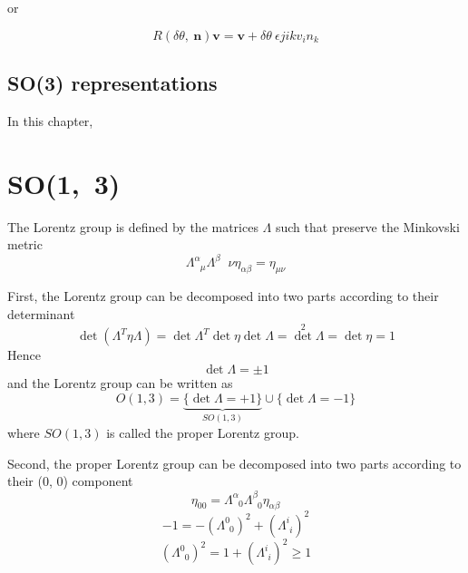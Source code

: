     or 

    \begin{equation*}
        R(\delta \theta, ~ \mathbf n) \mathbf v = \mathbf v + \delta \theta ~ \epsilon{jik} v_i n_k 
    \end{equation*}


\section{SO(3) representations}

    In this chapter, 

\chapter{SO(1,~3)}

    The Lorentz group is defined by the matrices $\Lambda$ such that preserve the Minkovski metric 
    \begin{equation}\label{lorentz}
        \Lambda^\alpha_{\phantom \alpha \mu} \Lambda^\beta{\phantom \beta \nu} \eta_{\alpha \beta} = \eta_{\mu \nu}
    \end{equation}

    First, the Lorentz group can be decomposed into two parts according to their determinant
    \begin{equation*}
        \det (\Lambda^T \eta \Lambda) = \det \Lambda^T \det \eta \det \Lambda = \det^2 \Lambda = \det \eta = 1
    \end{equation*}
    Hence 
    \begin{equation*}
        \det \Lambda = \pm 1
    \end{equation*}
    and the Lorentz group can be written as
    \begin{equation*}
        O(1,3) = \underbrace{\{\det \Lambda = +1\}}_{SO(1,3)} \cup \{\det \Lambda = - 1\} 
    \end{equation*}
    where $SO(1,3)$ is called the proper Lorentz group.

    Second, the proper Lorentz group can be decomposed into two parts according to their (0, 0) component
    \begin{equation*}
        \eta_{00} = \Lambda^\alpha_{\phantom \alpha 0} \Lambda^\beta_{\phantom \beta 0} \eta_{\alpha \beta}
    \end{equation*}
    \begin{equation*}
        -1 = -(\Lambda^0_{\phantom 0 0})^2 + (\Lambda^i_{\phantom i i})^2
    \end{equation*}
    \begin{equation*}
        (\Lambda^0_{\phantom 0 0})^2 = 1 + (\Lambda^i_{\phantom i i})^2 \geq 1
    \end{equation*}
    
